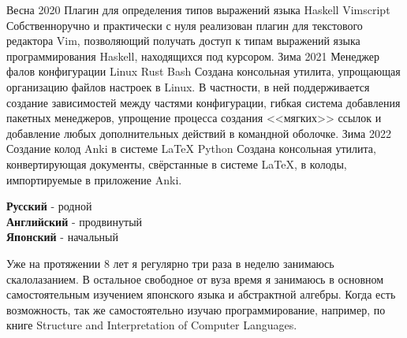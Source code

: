 \documentclass[9pt]{developercv} %
\begin{document}


\begin{entrylist}
    \entry
        {Весна 2020}
        {Плагин для определения типов выражений языка Haskell}
        {Vimscript}
        {Собственноручно и практически с нуля реализован плагин для текстового редактора Vim, позволяющий получать доступ к типам выражений языка программирования Haskell, находящихся под курсором.}
    \entry
        {Зима 2021}
        {Менеджер фалов конфигурации Linux}
        {Rust \slashsep Bash}
        {Создана консольная утилита, упрощающая организацию файлов настроек в Linux. В частности, в ней поддерживается создание зависимостей между частями конфигурации, гибкая система добавления пакетных менеджеров, упрощение процесса создания <<мягких>> ссылок и добавление любых дополнительных действий в командной оболочке.}
    \entry
        {Зима 2022}
        {Создание колод Anki в системе LaTeX}
        {Python}
        {Создана консольная утилита, конвертирующая документы, свёрстанные в системе LaTeX, в колоды, импортируемые в приложение Anki.}
\end{entrylist}


\begin{minipage}[t]{0.3\textwidth}
	\vspace{-\baselineskip} %


	\textbf{Русский} - родной\\
	\textbf{Английский} - продвинутый\\
	\textbf{Японский} - начальный
\end{minipage}
\hfill
\begin{minipage}[t]{0.7\textwidth}
	\vspace{-\baselineskip} %


    Уже на протяжении 8 лет я регулярно три раза в неделю занимаюсь скалолазанием. В остальное свободное от вуза время я занимаюсь в основном самостоятельным изучением японского языка и абстрактной алгебры. Когда есть возможность, так же самостоятельно изучаю программирование, например, по книге Structure and Interpretation of Computer Languages.
\end{minipage}

\end{document}
